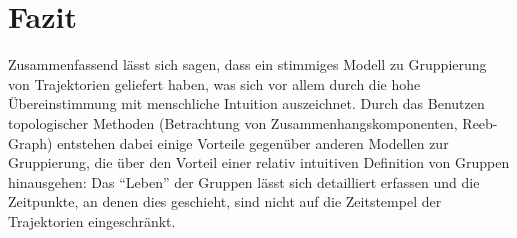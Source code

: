 \section{Fazit}
Zusammenfassend lässt sich sagen, dass \textcite{buchin2015} ein stimmiges Modell zu Gruppierung von Trajektorien geliefert haben, was sich vor allem durch die hohe Übereinstimmung mit menschliche Intuition auszeichnet.
Durch das Benutzen topologischer Methoden (Betrachtung von Zusammenhangskomponenten, Reeb-Graph) entstehen dabei einige Vorteile gegenüber anderen Modellen zur Gruppierung, die über den Vorteil einer relativ intuitiven Definition von Gruppen hinausgehen: Das \enquote{Leben} der Gruppen lässt sich detailliert erfassen und die Zeitpunkte, an denen dies geschieht, sind nicht auf die Zeitstempel der Trajektorien eingeschränkt.
